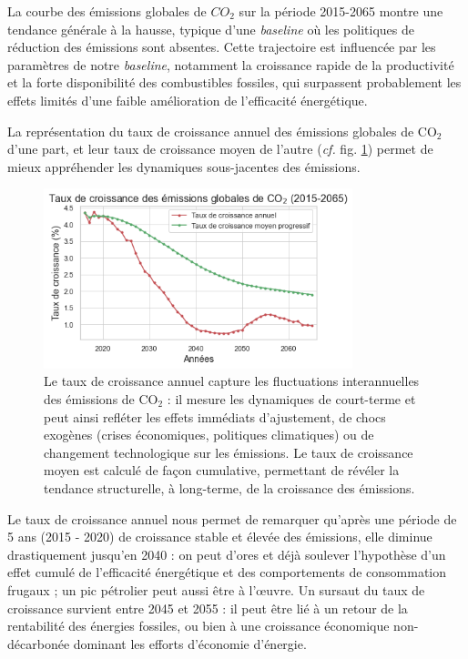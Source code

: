 \documentclass[a4,11pt]{aleph-notas}
\begin{document}
La courbe des émissions globales de $CO_2$ sur la période 2015-2065 montre une tendance générale à la hausse, typique d'une \textit{baseline} où les politiques de réduction des émissions sont absentes. Cette trajectoire est influencée par les paramètres de notre \textit{baseline}, notamment la croissance rapide de la productivité et la forte disponibilité des combustibles fossiles, qui surpassent probablement les effets limités d’une faible amélioration de l’efficacité énergétique.

La représentation du taux de croissance annuel des émissions globales de CO$_2$ d'une part, et leur taux de croissance moyen de l'autre (\textit{cf.} fig. \ref{fig:croissance_co2_baseline}) permet de mieux appréhender les dynamiques sous-jacentes des émissions. 

\begin{figure}[H]
    \centering
    \includegraphics[width=0.8\textwidth]{images_IMACLIM/croissance_co2_baseline.png}
    \caption{Le taux de croissance annuel capture les fluctuations interannuelles des émissions de CO$_2$ : il mesure les dynamiques de court-terme et peut ainsi refléter les effets immédiats d'ajustement, de chocs exogènes (crises économiques, politiques climatiques) ou de changement technologique sur les émissions.
    Le taux de croissance moyen est calculé de façon cumulative, permettant de révéler la tendance structurelle, à long-terme, de la croissance des émissions.}
    \label{fig:croissance_co2_baseline}
\end{figure}

Le taux de croissance annuel nous permet de remarquer qu'après une période de 5 ans (2015 - 2020) de croissance stable et élevée des émissions, elle diminue drastiquement jusqu'en 2040 : on peut d'ores et déjà soulever l'hypothèse d'un effet cumulé de l'efficacité énergétique et des comportements de consommation frugaux ; un pic pétrolier peut aussi être à l'œuvre. Un sursaut du taux de croissance survient entre 2045 et 2055 : il peut être lié à un retour de la rentabilité des énergies fossiles, ou bien à une croissance économique non-décarbonée dominant les efforts d'économie d'énergie. 
\end{document}
